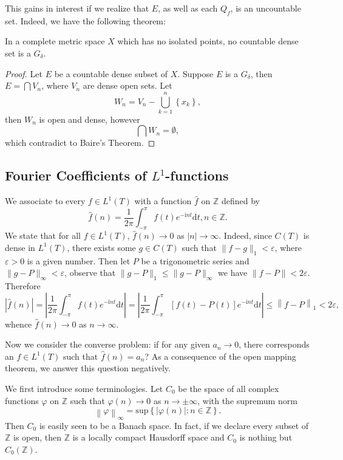 This gains in interest if we realize that $E$, as well as each $Q_f$, is an uncountable set. Indeed, we have the following theorem: 
\begin{theorem}
In a complete metric space $X$ which has no isolated points, no countable dense set is a $G_\delta$.
\end{theorem}
\begin{proof}
Let $E$ be a countable dense subset of $X$. Suppose $E$ is a $G_\delta$, then $E=\bigcap V_n$, where $V_n$ are dense open sets. Let 
$$
W_n=V_n-\bigcup_{k=1}^n{\left\{ x_k \right\}},
$$
then $W_n$ is open and dense, however 
$$
\bigcap{W_n}=\emptyset ,
$$
which contradict to Baire's Theorem.
\end{proof}
\subsection{Fourier Coefficients of $L^1$-functions}
We associate to every $f\in L^1(T)$ with a function $\widehat{f}$ on $\mathbb{Z}$ defined by 
$$
\widehat{f}\left( n \right) =\frac{1}{2\pi}\int_{-\pi}^{\pi}{f\left( t \right) e^{-\mathrm{i}nt}\mathrm{d}t},n\in \mathbb{Z} .
$$
We state that for all $f\in L^1(T)$, $\widehat{f}(n)\to 0$ as $|n|\to\infty$. Indeed, since $C(T)$ is dense in $L^1(T)$, there exists some $g\in C(T)$ such that $\|f-g\|_1<\varepsilon$, where $\varepsilon>0$ is a given number. Then let $P$ be a trigonometric series and $\|g-P\|_\infty<\varepsilon$, observe that $\|g-P\|_1\le\|g-P\|_\infty$ we have $\|f-P\|<2\varepsilon$. Therefore 
$$
\left| \widehat{f}\left( n \right) \right|=\left| \frac{1}{2\pi}\int_{-\pi}^{\pi}{f\left( t \right) e^{-\mathrm{i}nt}\mathrm{d}t} \right|=\left| \frac{1}{2\pi}\int_{-\pi}^{\pi}{\left[ f\left( t \right) -P\left( t \right) \right] e^{-\mathrm{i}nt}\mathrm{d}t} \right|\le \left\| f-P \right\| _1<2\varepsilon ,
$$
whence $\widehat{f}(n)\to 0$ as $n\to\infty$.\par
Now we consider the converse problem: if for any given $a_n\to 0$, there corresponds an $f\in L^1(T)$ such that $\widehat{f}(n)=a_n$? As a consequence of the open mapping theorem, we answer this question negatively.\par
We first introduce some terminologies. Let $C_0$ be the space of all complex functions $\varphi$ on $\mathbb{Z}$ such that $\varphi(n)\to 0$ as $n\to\pm\infty$, with the supremum norm 
$$
\left\| \varphi \right\| _{\infty}=\mathrm{sup}\left\{ \left| \varphi \left( n \right) \right|:n\in \mathbb{Z} \right\} .
$$
Then $C_0$ is easily seen to be a Banach space. In fact, if we declare every subset of $\mathbb{Z}$ is open, then $\mathbb{Z}$ is a locally compact Hausdorff space and $C_0$ is nothing but $C_0(\mathbb{Z})$.\par

